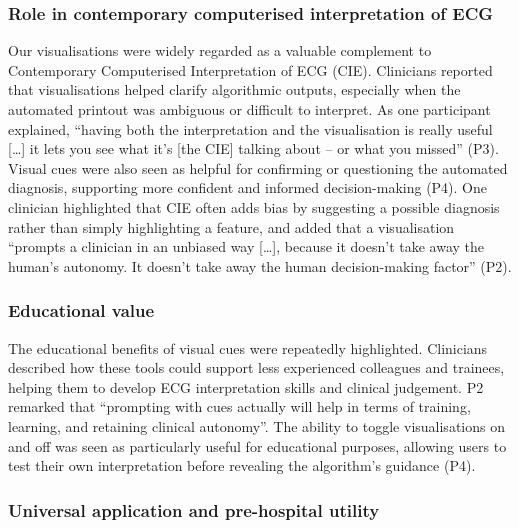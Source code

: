 \documentclass[
  10pt,
  letterpaper,
]{article}
\begin{document}
\subsubsection{Role in contemporary computerised interpretation of
ECG}\label{role-in-contemporary-computerised-interpretation-of-ecg}

Our visualisations were widely regarded as a valuable complement to
Contemporary Computerised Interpretation of ECG (CIE). Clinicians
reported that visualisations helped clarify algorithmic outputs,
especially when the automated printout was ambiguous or difficult to
interpret. As one participant explained, ``having both the
interpretation and the visualisation is really useful {[}\ldots{]} it
lets you see what it's {[}the CIE{]} talking about -- or what you
missed'' (P3). Visual cues were also seen as helpful for confirming or
questioning the automated diagnosis, supporting more confident and
informed decision-making (P4). One clinician highlighted that CIE often
adds bias by suggesting a possible diagnosis rather than simply
highlighting a feature, and added that a visualisation ``prompts a
clinician in an unbiased way {[}\ldots{]}, because it doesn't take away
the human's autonomy. It doesn't take away the human decision-making
factor'' (P2).

\subsubsection{Educational value}\label{educational-value}

The educational benefits of visual cues were repeatedly highlighted.
Clinicians described how these tools could support less experienced
colleagues and trainees, helping them to develop ECG interpretation
skills and clinical judgement. P2 remarked that ``prompting with cues
actually will help in terms of training, learning, and retaining
clinical autonomy''. The ability to toggle visualisations on and off was
seen as particularly useful for educational purposes, allowing users to
test their own interpretation before revealing the algorithm's guidance
(P4).

\subsubsection{Universal application and pre-hospital
utility}\label{universal-application-and-pre-hospital-utility}
\end{document}
